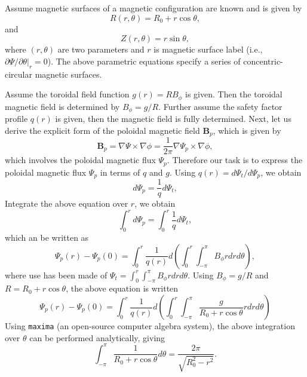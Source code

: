 \documentclass{article}
\newcommand{\nobracket}{}
\newcommand{\code}[1]{\texttt{#1}}
\begin{document}
Assume magnetic surfaces of a magnetic configuration are known and is given by
\begin{equation}
  R (r, \theta) = R_0 + r \cos \theta,
\end{equation}
and
\begin{equation}
  Z (r, \theta) = r \sin \theta,
\end{equation}
where $(r, \theta)$ are two parameters and $r$ is magnetic surface label
(i.e., $\partial \Psi / \partial \theta |_r = 0 \nobracket$). The above
parametric equations specify a series of concentric-circular magnetic
surfaces.

Assume the toroidal field function $g (r) = R B_{\phi}$ is given. Then the
toroidal magnetic field is determined by $B_{\phi} = g / R$. Further assume
the safety factor profile $q (r)$ is given, then the magnetic field is fully
determined. Next, let us derive the explicit form of the poloidal magnetic
field $\mathbf{B}_p$, which is given by
\begin{equation}
  \label{17-11-21-6} \mathbf{B}_p = \nabla \Psi \times \nabla \phi =
  \frac{1}{2 \pi} \nabla \Psi_p \times \nabla \phi,
\end{equation}
which involves the poloidal magnetic flux $\Psi_p$. Therefore our task is to
express the poloidal magnetic flux $\Psi_p$ in terms of $q$ and $g$. Using $q
(r) = d \Psi_t / d \Psi_p$, we obtain
\[ d \Psi_p = \frac{1}{q} d \Psi_t, \]
Integrate the above equation over $r$, we obtain
\begin{equation}
  \int_0^r d \Psi_p = \int_0^r \frac{1}{q} d \Psi_t,
\end{equation}
which an be written as
\begin{equation}
  \Psi_p (r) - \Psi_p (0) = \int_0^r \frac{1}{q (r)} d \left( \int_0^r \int_{-
  \pi}^{\pi} B_{\phi} r d r d \theta \right),
\end{equation}
where use has been made of $\Psi_t = \int_0^r \int_{- \pi}^{\pi} B_{\phi} r d
r d \theta$. Using $B_{\phi} = g / R$ and $R = R_0 + r \cos \theta$, the above
equation is written
\begin{equation}
  \label{17-11-21-1} \Psi_p (r) - \Psi_p (0) = \int_0^r \frac{1}{q (r)} d
  \left( \int_0^r \int_{- \pi}^{\pi} \frac{g}{R_0 + r \cos \theta} r d r d
  \theta \right)
\end{equation}
Using {\code{maxima}} (an open-source computer algebra system), the above
integration over $\theta$ can be performed analytically, giving
\begin{equation}
  \int_{- \pi}^{\pi} \frac{1}{R_0 + r \cos \theta} d \theta = \frac{2
  \pi}{\sqrt{R_0^2 - r^2}} .
\end{equation}
\end{document}
